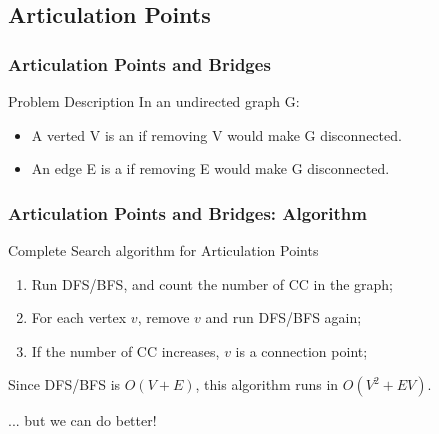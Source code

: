 \documentclass{beamer}
\begin{document}
\subsection{Articulation Points}

\begin{frame}
  \frametitle{Articulation Points and Bridges}
  {\smaller
    \begin{block}{Problem Description}
      In an undirected graph G:
      \begin{itemize}
      \item A verted V is an  if removing V would make G disconnected.
      \item An edge E is a  if removing E would make G disconnected.
      \end{itemize}
    \end{block}
    \begin{center}
      \end{center}
  }
\end{frame}

\begin{frame}
  \frametitle{Articulation Points and Bridges: Algorithm}
  {\smaller
    \begin{block}{Complete Search algorithm for Articulation Points}
      \begin{enumerate}
      \item Run DFS/BFS, and count the number of CC in the graph;
      \item For each vertex $v$, remove $v$ and run DFS/BFS again;
      \item If the number of CC increases, $v$ is a connection point;
      \end{enumerate}
      Since DFS/BFS is $O(V+E)$, this algorithm runs in $O(V^2+EV)$.
    \end{block}
    
    \bigskip

    \hfill ... but we can do better!
  }
\end{frame}
\end{document}
